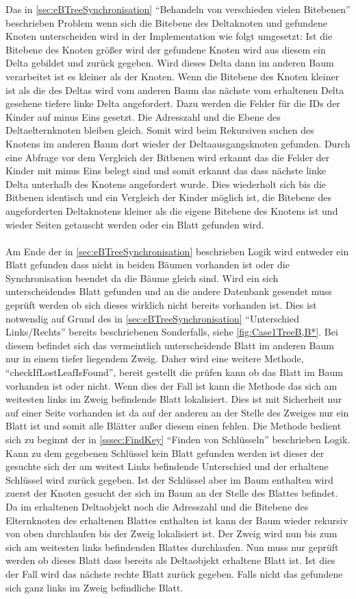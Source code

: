 \documentclass[a4paper,11pt,oneside,%
headsepline,												%
footsepline,												%
bibtotocnumbered									%
]{scrreprt}
\begin{document}
Das in \autoref{sec:eBTreeSynchronisation} \enquote{Behandeln von verschieden vielen Bitebenen} beschrieben Problem wenn sich die Bitebene des Deltaknoten und gefundene Knoten unterscheiden wird in der Implementation wie folgt umgesetzt: Ist die Bitebene des Knoten größer wird der gefundene Knoten wird aus diesem ein Delta gebildet und zurück gegeben. Wird dieses Delta dann im anderen Baum verarbeitet ist es kleiner als der Knoten. Wenn die Bitebene des Knoten kleiner ist als die des Deltas wird vom anderen Baum das nächste vom erhaltenen Delta gesehene tiefere linke Delta angefordert. Dazu werden die Felder für die \ac{ID}s der Kinder auf minus Eins gesetzt. Die Adresszahl und die Ebene des Deltaelternknoten bleiben gleich. Somit wird beim Rekursiven suchen des Knotens im anderen Baum dort wieder der Deltaausgangsknoten gefunden. Durch eine Abfrage vor dem Vergleich der Bitbenen wird erkannt das die Felder der Kinder mit minus Eins belegt sind und somit erkannt das dass nächste linke Delta unterhalb des Knotens angefordert wurde. Dies wiederholt sich bis die Bitbenen identisch und ein Vergleich der Kinder möglich ist, die Bitebene des angeforderten Deltaknotens kleiner als die eigene Bitebene des Knotens ist und wieder Seiten getauscht werden oder ein Blatt gefunden wird.\\\\
Am Ende der in \autoref{sec:eBTreeSynchronisation} beschrieben Logik wird entweder ein Blatt gefunden dass nicht in beiden Bäumen vorhanden ist oder die Synchronisation beendet da die Bäume gleich sind. Wird ein sich unterscheidendes Blatt gefunden und an die andere Datenbank gesendet muss geprüft werden ob sich dieses wirklich nicht bereits vorhanden ist. Dies ist notwendig auf Grund des in \autoref{sec:eBTreeSynchronisation} \enquote{Unterschied Links/Rechts} bereits beschriebenen Sonderfalls, siehe \autoref{fig:Case1TreeB,B*}. Bei diesem befindet sich das vermeintlich unterscheidende Blatt im anderen Baum nur in einem tiefer liegendem Zweig. Daher wird eine weitere Methode, \enquote{checkIfLostLeafIsFound}, bereit gestellt die prüfen kann ob das Blatt im Baum vorhanden ist oder nicht. Wenn dies der Fall ist kann die Methode das sich am weitesten links im Zweig befindende Blatt lokalisiert. Dies ist mit Sicherheit nur auf einer Seite vorhanden ist da auf der anderen an der Stelle des Zweiges nur ein Blatt ist und somit alle Blätter außer diesem einen fehlen. Die Methode bedient sich zu beginnt der in \autoref{sssec:FindKey} \enquote{Finden von Schlüsseln} beschrieben Logik. Kann zu dem gegebenen Schlüssel kein Blatt gefunden werden ist dieser der gesuchte sich der am weitest Links befindende Unterschied und der erhaltene Schlüssel wird zurück gegeben. Ist der Schlüssel aber im Baum enthalten wird zuerst der Knoten gesucht der sich im Baum an der Stelle des Blattes befindet. Da im erhaltenen Deltaobjekt noch die Adresszahl und die Bitebene des Elternknoten des erhaltenen Blattes enthalten ist kann der Baum wieder rekursiv von oben durchlaufen bis der Zweig lokalisiert ist. Der Zweig wird nun bis zum sich am weitesten links befindenden Blattes durchlaufen. Nun muss nur geprüft werden ob dieses Blatt dass bereits als Deltaobjekt erhaltene Blatt ist. Ist dies der Fall wird das nächste rechte Blatt zurück gegeben. Falls nicht das gefundene sich ganz links im Zweig befindliche Blatt. 
\end{document}
